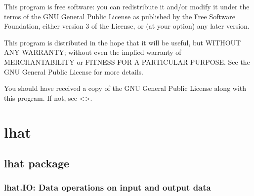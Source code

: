\documentclass[letterpaper,10pt,english]{sphinxmanual}
\begin{document}
This program is free software: you can redistribute it and/or modify
it under the terms of the GNU General Public License as published by
the Free Software Foundation, either version 3 of the License, or
(at your option) any later version.

This program is distributed in the hope that it will be useful,
but WITHOUT ANY WARRANTY; without even the implied warranty of
MERCHANTABILITY or FITNESS FOR A PARTICULAR PURPOSE.  See the
GNU General Public License for more details.

You should have received a copy of the GNU General Public License
along with this program.  If not, see \textless{}\textgreater{}.


\section{lhat}
\label{\detokenize{modules:lhat}}\label{\detokenize{modules::doc}}

\subsection{lhat package}
\label{\detokenize{lhat:lhat-package}}\label{\detokenize{lhat::doc}}

\subsubsection{lhat.IO: Data operations on input and output data}
\label{\detokenize{lhat:module-lhat.IO}}\label{\detokenize{lhat:lhat-io-data-operations-on-input-and-output-data}}
\end{document}

